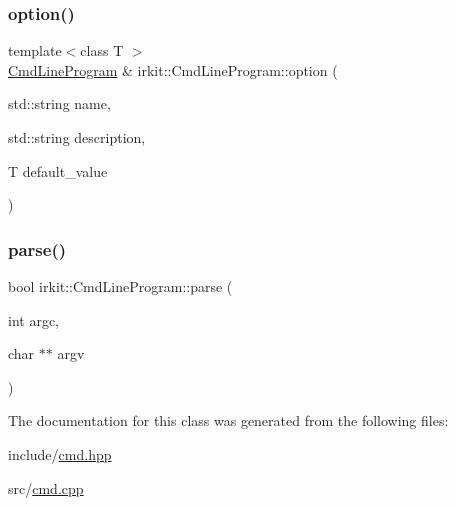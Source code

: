 \subsubsection{\texorpdfstring{option()}{option()}\hspace{0.1cm}{\footnotesize\ttfamily [2/2]}}
{\footnotesize\ttfamily template$<$class T $>$ \\
\mbox{\hyperlink{classirkit_1_1CmdLineProgram}{Cmd\+Line\+Program}} \& irkit\+::\+Cmd\+Line\+Program\+::option (\begin{DoxyParamCaption}\item[{std\+::string}]{name,  }\item[{std\+::string}]{description,  }\item[{T}]{default\+\_\+value }\end{DoxyParamCaption})\hspace{0.3cm}{\ttfamily [inline]}}

\mbox{\label{classirkit_1_1CmdLineProgram_aa87697ac96df198f7d9f4775a7a1999f}} 
\subsubsection{\texorpdfstring{parse()}{parse()}}
{\footnotesize\ttfamily bool irkit\+::\+Cmd\+Line\+Program\+::parse (\begin{DoxyParamCaption}\item[{int}]{argc,  }\item[{char $\ast$$\ast$}]{argv }\end{DoxyParamCaption})\hspace{0.3cm}{\ttfamily [inline]}}



The documentation for this class was generated from the following files\+:\begin{DoxyCompactItemize}
\item 
include/\mbox{\hyperlink{cmd_8hpp}{cmd.\+hpp}}\item 
src/\mbox{\hyperlink{cmd_8cpp}{cmd.\+cpp}}\end{DoxyCompactItemize}
